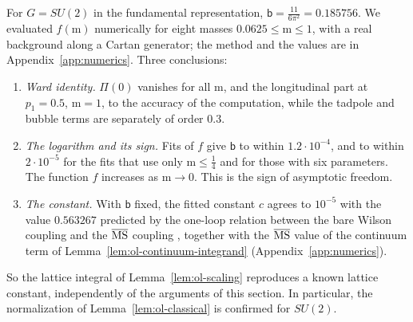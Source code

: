 \begin{remark}\label{rem:ol-f-numerical}
For $G=SU(2)$ in the fundamental representation, $\mathsf b=\frac{11}{6\pi^2}=0.185756$. We evaluated $f(\mathrm m)$ numerically for eight masses $0.0625\le\mathrm m\le1$, with a real background along a Cartan generator; the method and the values are in Appendix~\ref{app:numerics}. Three conclusions:
\begin{enumerate}[label=(\roman*)]
\item \emph{Ward identity.} $\Pi(0)$ vanishes for all $\mathrm m$, and the longitudinal part at $p_1=0.5$, $\mathrm m=1$, to the accuracy of the computation, while the tadpole and bubble terms are separately of order $0.3$.
\item \emph{The logarithm and its sign.} Fits of $f$ give $\mathsf b$ to within $1.2\cdot10^{-4}$, and to within $2\cdot10^{-5}$ for the fits that use only $\mathrm m\le\frac14$ and for those with six parameters. The function $f$ increases as $\mathrm m\to0$. This is the sign of asymptotic freedom.
\item \emph{The constant.} With $\mathsf b$ fixed, the fitted constant $c$ agrees to $10^{-5}$ with the value $0.563267$ predicted by the one-loop relation between the bare Wilson coupling and the $\overline{\rm MS}$ coupling \cite{DashenGross,HasenfratzLambda}, together with the $\overline{\rm MS}$ value of the continuum term of Lemma~\ref{lem:ol-continuum-integrand} (Appendix~\ref{app:numerics}).
\end{enumerate}
So the lattice integral of Lemma~\ref{lem:ol-scaling} reproduces a known lattice constant, independently of the arguments of this section. In particular, the normalization of Lemma~\ref{lem:ol-classical} is confirmed for $SU(2)$.
\end{remark}

